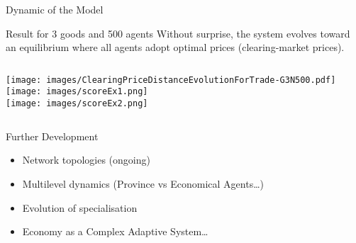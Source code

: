 \documentclass[8pt, handout=show,notes=show]{beamer}
\begin{document}
%
%
%
%
%


\begin{frame}{Dynamic of the Model}


	\begin{block}{Result for 3 goods and 500 agents}
		Without surprise, the system evolves toward an equilibrium where all agents adopt optimal prices (clearing-market prices). 
	\end{block}
	\begin{columns}
		\texttt{[image: images/ClearingPriceDistanceEvolutionForTrade-G3N500.pdf]}
		\texttt{[image: images/scoreEx1.png]}\\
		 \texttt{[image: images/scoreEx2.png]}
	\end{columns}
	
\end{frame}

\begin{frame}{Further Development}
	\begin{itemize}
		\item Network topologies (ongoing)
			\vfil
		\item	Multilevel dynamics (Province vs Economical Agents\ldots)
			\vfil
		\item	Evolution of specialisation 
			\vfil
		\item	Economy as a Complex Adaptive System\ldots
	\end{itemize}
\end{frame}
\end{document}

